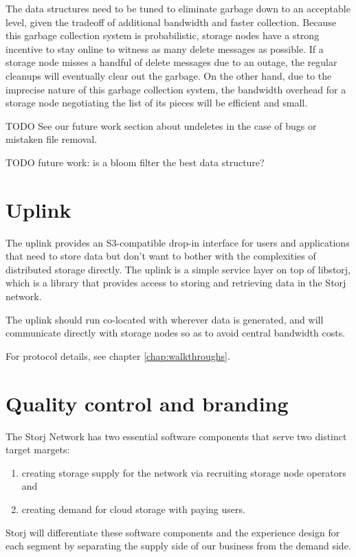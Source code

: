 \documentclass[11pt,fleqn,openany]{book}
\newcommand{\todo}[1]{{\color{red} TODO #1 }}
\begin{document}
The data structures need to be tuned to eliminate garbage down to an acceptable
level, given the tradeoff of additional bandwidth and faster collection.
Because this garbage collection system is probabilistic, storage nodes have a
strong incentive to stay online to witness as many delete messages as possible.
If a storage node misses a handful of delete messages due to an outage, the
regular cleanups will eventually clear out the garbage.
On the other hand, due to the imprecise nature of this garbage collection
system, the
bandwidth overhead for a storage node negotiating the list of its pieces
will be efficient and small.

\todo{See our future work section about undeletes in
the case of bugs or mistaken file removal.}

\todo{future work: is a bloom filter the best data structure?}

\section{Uplink}

The uplink provides an S3-compatible drop-in interface for users and
applications that
need to store data but don't want to bother with the complexities of distributed
storage directly. The uplink is a simple service layer on top of libstorj,
which is a library that provides access to storing and retrieving data in the
Storj network.

The uplink should run co-located with wherever data is generated, and will
communicate directly with storage nodes so as to avoid central bandwidth costs.

For protocol details, see chapter \ref{chap:walkthroughs}.

\section{Quality control and branding}

The Storj Network has two essential software components that serve two distinct
target margets:

\begin{enumerate}
\item creating storage supply for the network via recruiting storage node
  operators and
\item creating demand for cloud storage with paying users.
\end{enumerate}

Storj will differentiate these software components and the experience design
for each segment by separating the supply side of our business from the
demand side.
\end{document}
